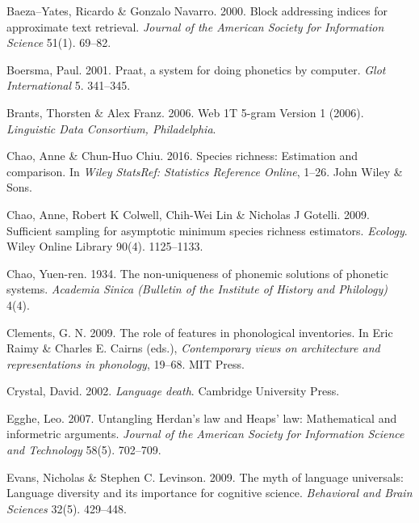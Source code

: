 \documentclass[
]{article}
\newlength{\cslhangindent}
\newlength{\cslentryspacingunit} %
\newenvironment{CSLReferences}[2] %
 {%
  \setlength{\parindent}{0pt}
  \ifodd #1
  \let\oldpar\par
  \def\par{\hangindent=\cslhangindent\oldpar}
  \fi
  \setlength{\parskip}{#2\cslentryspacingunit}
 }%
 {}
\begin{document}
\hypertarget{refs}{}
\begin{CSLReferences}{1}{0}
\leavevmode{}%
Baeza--Yates, Ricardo \& Gonzalo Navarro. 2000. Block addressing indices
for approximate text retrieval. \emph{Journal of the American Society
for Information Science} 51(1). 69--82.

\leavevmode{}%
Boersma, Paul. 2001. Praat, a system for doing phonetics by computer.
\emph{Glot International} 5. 341--345.

\leavevmode{}%
Brants, Thorsten \& Alex Franz. 2006. {Web 1T 5-gram Version 1 (2006)}.
\emph{Linguistic Data Consortium, Philadelphia}.

\leavevmode{}%
Chao, Anne \& Chun-Huo Chiu. 2016. Species richness: Estimation and
comparison. In \emph{{Wiley StatsRef: Statistics Reference Online}},
1--26. John Wiley \& Sons.

\leavevmode{}%
Chao, Anne, Robert K Colwell, Chih-Wei Lin \& Nicholas J Gotelli. 2009.
Sufficient sampling for asymptotic minimum species richness estimators.
\emph{Ecology}. Wiley Online Library 90(4). 1125--1133.

\leavevmode{}%
Chao, Yuen-ren. 1934. The non-uniqueness of phonemic solutions of
phonetic systems. \emph{Academia Sinica (Bulletin of the Institute of
History and Philology)} 4(4).

\leavevmode{}%
Clements, G. N. 2009. The role of features in phonological inventories.
In Eric Raimy \& Charles E. Cairns (eds.), \emph{Contemporary views on
architecture and representations in phonology}, 19--68. MIT Press.

\leavevmode{}%
Crystal, David. 2002. \emph{Language death}. Cambridge University Press.

\leavevmode{}%
Egghe, Leo. 2007. Untangling {Herdan's} law and {Heaps'} law:
Mathematical and informetric arguments. \emph{Journal of the American
Society for Information Science and Technology} 58(5). 702--709.

\leavevmode{}%
Evans, Nicholas \& Stephen C. Levinson. 2009. The myth of language
universals: Language diversity and its importance for cognitive science.
\emph{Behavioral and Brain Sciences} 32(5). 429--448.


\end{CSLReferences}
\end{document}
